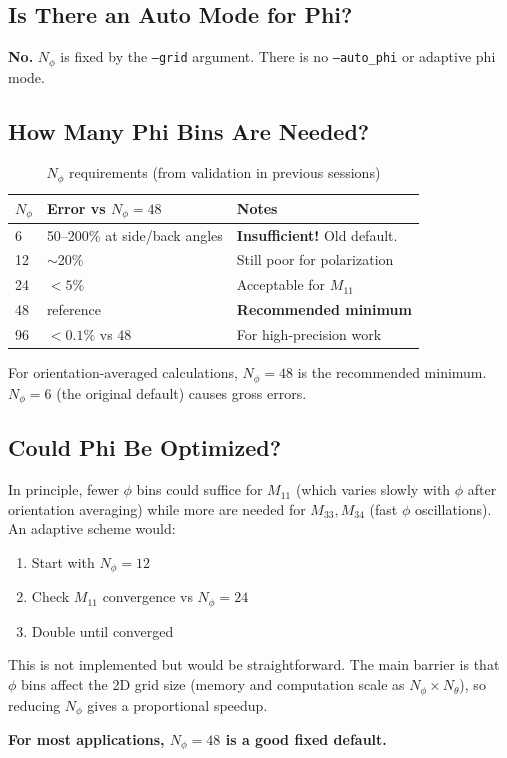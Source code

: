 \documentclass[11pt,a4paper]{article}
\begin{document}
\subsection{Is There an Auto Mode for Phi?}

\textbf{No.} $N_\phi$ is fixed by the \texttt{--grid} argument. There is no \texttt{--auto\_phi}
or adaptive phi mode.

\subsection{How Many Phi Bins Are Needed?}

\begin{table}[h]\centering
\caption{$N_\phi$ requirements (from validation in previous sessions)}
\begin{tabular}{lll}
\toprule
$N_\phi$ & Error vs $N_\phi{=}48$ & Notes \\
\midrule
6    & 50--200\% at side/back angles & \textbf{Insufficient!} Old default. \\
12   & $\sim$20\% & Still poor for polarization \\
24   & $<5\%$ & Acceptable for $M_{11}$ \\
48   & reference & \textbf{Recommended minimum} \\
96   & $<0.1\%$ vs 48 & For high-precision work \\
\bottomrule
\end{tabular}
\end{table}

For orientation-averaged calculations, $N_\phi = 48$ is the recommended minimum.
$N_\phi = 6$ (the original default) causes gross errors.

\subsection{Could Phi Be Optimized?}

In principle, fewer $\phi$ bins could suffice for $M_{11}$ (which varies slowly with $\phi$ after
orientation averaging) while more are needed for $M_{33}, M_{34}$ (fast $\phi$ oscillations).
An adaptive scheme would:
\begin{enumerate}
\item Start with $N_\phi = 12$
\item Check $M_{11}$ convergence vs $N_\phi = 24$
\item Double until converged
\end{enumerate}

This is not implemented but would be straightforward. The main barrier is that $\phi$ bins
affect the 2D grid size (memory and computation scale as $N_\phi \times N_\theta$), so
reducing $N_\phi$ gives a proportional speedup.

\textbf{For most applications, $N_\phi = 48$ is a good fixed default.}
\end{document}
